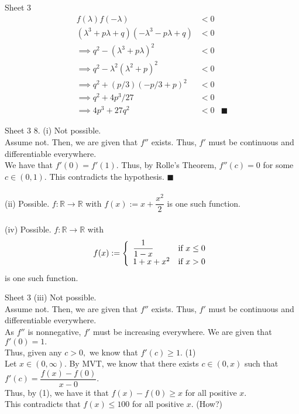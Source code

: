 \documentclass[handout, aspectratio=169]{beamer}
\begin{document}
\begin{frame}{Sheet 3}		
	\begin{align*}
	 	f(\lambda)f(-\lambda) &< 0\\
	 	(\lambda^3 + p\lambda + q)(-\lambda^3 - p\lambda + q) &< 0\\
	 	\implies q^2 - (\lambda^3 + p\lambda)^2 &< 0\\
	 	\implies q^2 - \lambda^2(\lambda^2 +p)^2 &< 0\\
	 	\implies q^2 + (p/3)(-p/3 + p)^2 &< 0\\
	 	\implies q^2 + 4p^3/27 &< 0\\
	 	\implies 4p^3 + 27q^2 &< 0 & \blacksquare
	\end{align*} 
\end{frame}
\begin{frame}{Sheet 3}
	8. (i) Not possible.\\
	Assume not. Then, we are given that $f''$ exists. Thus, $f'$ must be continuous and differentiable everywhere.\\
	We have that $f'(0) = f'(1).$ Thus, by Rolle's Theorem, $f''(c) = 0$ for some $c \in (0, 1).$ This contradicts the hypothesis. \hfill $\blacksquare$\\~\\
	(ii) Possible. $f: \mathbb{R} \to \mathbb{R}$ with $f(x) := x + \dfrac{x^2}{2}$ is one such function. \\~\\
	(iv) Possible. $f:\mathbb{R} \to \mathbb{R}$ with
	\[f(x) := \left\{\begin{array}{l r}
		\dfrac{1}{1- x} & \text{if } x \le 0\\
		1 + x + x^2	& \text{if } x > 0
	\end{array}
	\right.\]
	is one such function.
\end{frame}
	
\begin{frame}{Sheet 3}
	(iii) Not possible.\\
	Assume not. Then, we are given that $f''$ exists. Thus, $f'$ must be continuous and differentiable everywhere.\\
	As $f''$ is nonnegative, $f'$ must be increasing everywhere. We are given that $f'(0) = 1.$ \\
	Thus, given any $c > 0,$ we know that $f'(c) \ge 1.$ \hfill (1)\\
	Let $x \in (0, \infty).$ By MVT, we know that there exists $c \in (0, x)$ such that $f'(c) = \dfrac{f(x) - f(0)}{x - 0}.$ \\ Thus, by (1), we have it that $f(x) - f(0) \ge x$ for all positive $x.$ \\
	This contradicts that $f(x) \le 100$ for all positive $x.$ (How?)
\end{frame}
\end{document}
